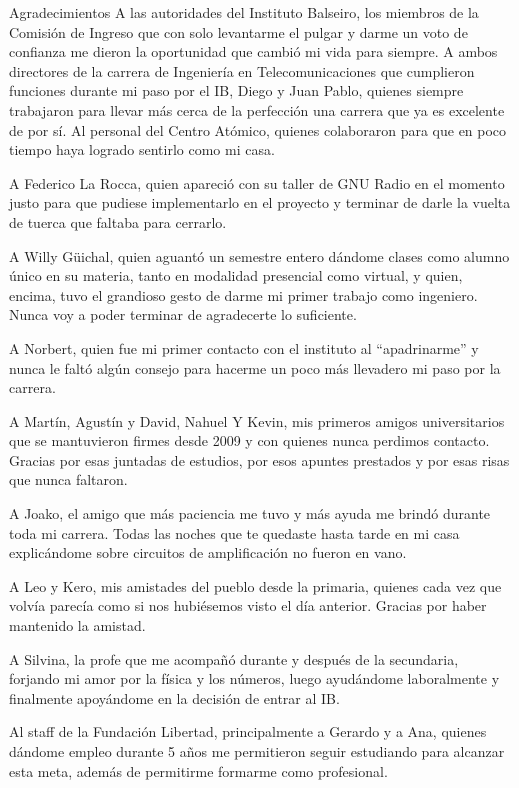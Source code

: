 \documentclass[screen,pagebackref]{ibtesis}
\begin{document}
\begin{postliminary}
\begin{seccion}{Agradecimientos}
        A las autoridades del Instituto Balseiro, los miembros de la Comisión de Ingreso que con solo levantarme el pulgar y darme un voto de confianza me dieron la oportunidad que cambió mi vida para siempre. A ambos directores de la carrera de Ingeniería en Telecomunicaciones que cumplieron funciones durante mi paso por el IB, Diego y Juan Pablo, quienes siempre trabajaron para llevar más cerca de la perfección una carrera que ya es excelente de por sí. Al personal del Centro Atómico, quienes colaboraron para que en poco tiempo haya logrado sentirlo como mi casa.

        A Federico La Rocca, quien apareció con su taller de GNU Radio en el momento justo para que pudiese implementarlo en el proyecto y terminar de darle la vuelta de tuerca que faltaba para cerrarlo.

        A Willy Güichal, quien aguantó un semestre entero dándome clases como alumno único en su materia, tanto en modalidad presencial como virtual, y quien, encima, tuvo el grandioso gesto de darme mi primer trabajo como ingeniero. Nunca voy a poder terminar de agradecerte lo suficiente.

        A Norbert, quien fue mi primer contacto con el instituto al ``apadrinarme'' y nunca le faltó algún consejo para hacerme un poco más llevadero mi paso por la carrera.

        A Martín, Agustín y David, Nahuel Y Kevin, mis primeros amigos universitarios que se mantuvieron firmes desde 2009 y con quienes nunca perdimos contacto. Gracias por esas juntadas de estudios, por esos apuntes prestados y por esas risas que nunca faltaron.

        A Joako, el amigo que más paciencia me tuvo y más ayuda me brindó durante toda mi carrera. Todas las noches que te quedaste hasta tarde en mi casa explicándome sobre circuitos de amplificación no fueron en vano.

        A Leo y Kero, mis amistades del pueblo desde la primaria, quienes cada vez que volvía parecía como si nos hubiésemos visto el día anterior. Gracias por haber mantenido la amistad.

        A Silvina, la profe que me acompañó durante y después de la secundaria, forjando mi amor por la física y los números, luego ayudándome laboralmente y finalmente apoyándome en la decisión de entrar al IB.

        Al staff de la Fundación Libertad, principalmente a Gerardo y a Ana, quienes dándome empleo durante 5 años me permitieron seguir estudiando para alcanzar esta meta, además de permitirme formarme como profesional.


\end{seccion}
\end{postliminary}
\end{document}

